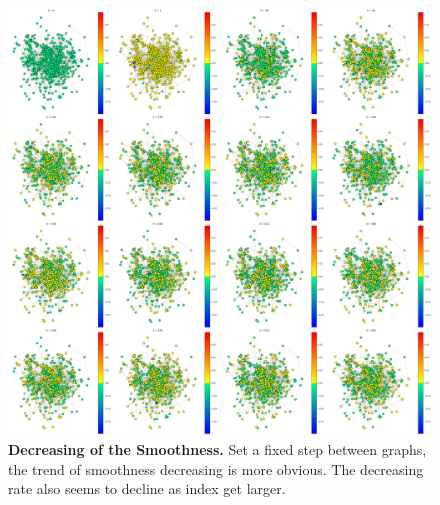\documentclass{article} %
\begin{document}
\begin{figure}[H]
      \graphicspath{ {images/} }
      \begin{center}
            \includegraphics[scale=0.2]{iND750.png}
      \end{center}
      \caption{\textbf{Decreasing of the Smoothness.} Set a fixed step between graphs, the trend of smoothness decreasing is more obvious. The decreasing rate also seems to decline as index get larger.}
      \label{fig:iND750}
\end{figure}




\end{document}
